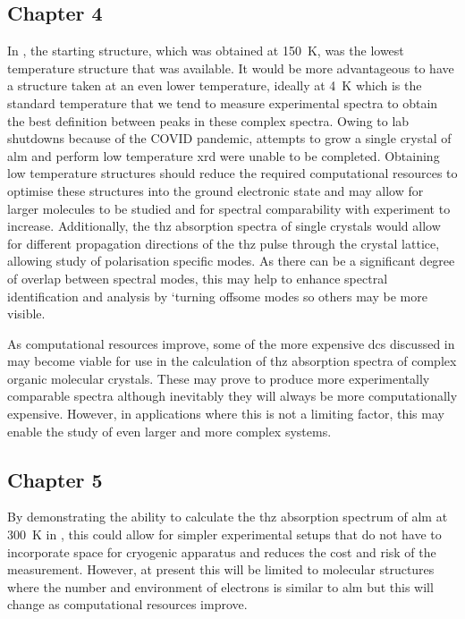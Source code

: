 \subsection{Chapter 4}
In , the starting structure, which was obtained at \SI{150}{K}, was the lowest temperature structure that was available. It would be more advantageous to have a structure taken at an even lower temperature, ideally at \SI{4}{K} which is the standard temperature that we tend to measure experimental spectra to obtain the best definition between peaks in these complex spectra. Owing to lab shutdowns because of the COVID pandemic, attempts to grow a single crystal of \acrshort{alm} and perform low temperature \acrshort{xrd} were unable to be completed. Obtaining low temperature structures should reduce the required computational resources to optimise these structures into the ground electronic state and may allow for larger molecules to be studied and for spectral comparability with experiment to increase. Additionally, the \acrshort{thz} absorption spectra of single crystals would allow for different propagation directions of the \acrshort{thz} pulse through the crystal lattice, allowing study of polarisation specific modes. As there can be a significant degree of overlap between spectral modes, this may help to enhance spectral identification and analysis by `turning off\DIFdelbegin {}\DIFdelend \DIFaddbegin {}\DIFaddend some modes so others may be more visible. 

As computational resources improve, some of the more expensive \acrshort{dc}s discussed in  may become viable for use in the calculation of \acrshort{thz} absorption spectra of complex organic molecular crystals. These may prove to produce more experimentally comparable spectra although inevitably they will always be more computationally expensive. However, in applications where this is not a limiting factor, this may enable the study of even larger and more complex systems.

\subsection{Chapter 5}
By demonstrating the ability to calculate the \acrshort{thz} absorption spectrum of \acrshort{alm} at \SI{300}{K} in , this could allow for simpler experimental setups that do not have to incorporate space for cryogenic apparatus and reduces the cost and risk of the measurement. However, at present this will be limited to molecular structures where the number and environment of electrons is similar to \acrshort{alm} but this will change as computational resources improve.

